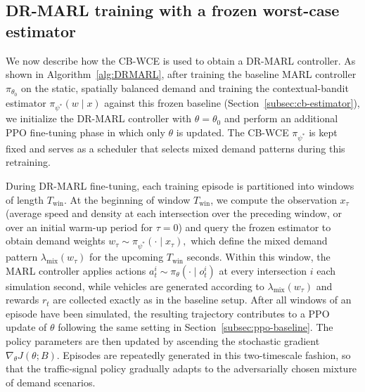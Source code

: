 \documentclass{ifacconf}
\newcommand{\1}{\mbox{1}\hspace{-0.25em}\mbox{l}}
\begin{document}
\subsection{DR-MARL training with a frozen worst-case estimator}
\label{subsec:drmarl}

We now describe how the CB-WCE is used to obtain a DR-MARL controller. As shown in Algorithm~\ref{alg:DRMARL}, after training the baseline MARL controller $\pi_{\theta_0}$ on the static, spatially balanced demand and training the contextual-bandit estimator $\pi_{\psi^\ast}(w \mid x)$ against this frozen baseline (Section~\ref{subsec:cb-estimator}), we initialize the DR-MARL controller with $\theta = \theta_0$ and perform an additional PPO fine-tuning phase in which only $\theta$ is updated. The CB-WCE $\pi_{\psi^\ast}$ is kept fixed and serves as a scheduler that selects mixed demand patterns during this retraining.

During DR-MARL fine-tuning, each training episode is partitioned into windows of length $T_{\mathrm{win}}$. At the beginning of window $T_{\mathrm{win}}$, we compute the observation $x_\tau$ (average speed and density at each intersection over the preceding window, or over an initial warm-up period for $\tau = 0$) and query the frozen estimator to obtain demand weights
$w_\tau \sim \pi_{\psi^\ast}(\cdot \mid x_\tau),$
which define the mixed demand pattern $\lambda_{\mathrm{mix}}(w_\tau)$ for the upcoming $T_{\mathrm{win}}$ seconds. Within this window, the MARL controller applies actions $a_t^i \sim \pi_\theta(\cdot \mid o_t^i)$ at every intersection $i$ each simulation second, while vehicles are generated according to $\lambda_{\mathrm{mix}}(w_\tau)$ and rewards $r_t$ are collected exactly as in the baseline setup. After all windows of an episode have been simulated, the resulting trajectory contributes to a PPO update of $\theta$ following the same setting in Section~\ref{subsec:ppo-baseline}. The policy parameters are then updated by ascending the stochastic gradient 
$\nabla_\theta J(\theta; B)$. Episodes are repeatedly generated in this two-timescale fashion, so that the traffic-signal policy gradually adapts to the adversarially chosen mixture of demand scenarios.
\end{document}
